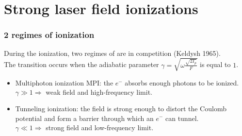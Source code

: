 \documentclass{beamer}
\begin{document}
\section{Strong laser field ionizations} %


\begin{frame}
\frametitle{2 regimes of ionization}
During the ionization, two regimes of are in competition (Keldysh 1965).\\
The transition occurs when the adiabatic parameter $\gamma=\sqrt{\omega\frac{\sqrt{2I_{p}}}{F}}$ is equal to $1$.
\begin{itemize}
\item
Multiphoton ionization MPI: the $e^{-}$ absorbs enough photons to be ionized. \\
$\gamma \gg 1 \Rightarrow$ weak field and high-frequency limit. 
\item
Tunneling ionization: the field is strong enough to distort the Coulomb potential and form a barrier through which an $e^{-}$ can tunnel. \\
$\gamma \ll 1 \Rightarrow$ strong field and low-frequency limit.
\end{itemize}
\end{frame}


\begin{frame}
\begin{figure}[htp]
\begin{subfigure} [t]{0.7\textwidth}
\centering
 \resizebox{1.7\textwidth}{!}{}
 \label{tunneling_ionization} 
\end{subfigure}
\end{figure}
\end{frame}

\end{document}
